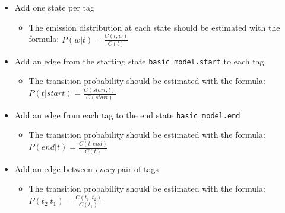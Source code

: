 \documentclass[11pt]{article}
\providecommand{\tightlist}{%
      \setlength{\itemsep}{0pt}\setlength{\parskip}{0pt}}
\begin{document}
\begin{itemize}
\tightlist
\item
  Add one state per tag

  \begin{itemize}
  \tightlist
  \item
    The emission distribution at each state should be estimated with the
    formula: \(P(w|t) = \frac{C(t, w)}{C(t)}\)
  \end{itemize}
\item
  Add an edge from the starting state \texttt{basic\_model.start} to
  each tag

  \begin{itemize}
  \tightlist
  \item
    The transition probability should be estimated with the formula:
    \(P(t|start) = \frac{C(start, t)}{C(start)}\)
  \end{itemize}
\item
  Add an edge from each tag to the end state \texttt{basic\_model.end}

  \begin{itemize}
  \tightlist
  \item
    The transition probability should be estimated with the formula:
    \(P(end|t) = \frac{C(t, end)}{C(t)}\)
  \end{itemize}
\item
  Add an edge between \emph{every} pair of tags

  \begin{itemize}
  \tightlist
  \item
    The transition probability should be estimated with the formula:
    \(P(t_2|t_1) = \frac{C(t_1, t_2)}{C(t_1)}\)
  \end{itemize}
\end{itemize}
\end{document}
